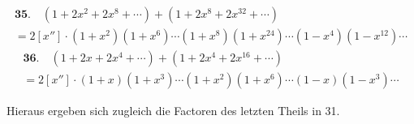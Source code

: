 \documentclass[10pt,a4paper]{article}
\begin{document}
%
\begin{multline*}
\textbf{35.} \quad (1 + 2x^2 + 2x^8 + \cdots) + (1 + 2x^8 + 2x^{32} + \cdots) \\
= 2[x''] \cdot (1 + x^2)(1 + x^6) \cdots (1 + x^8)(1 + x^{24}) \cdots (1 - x^4)(1 - x^{12}) \cdots
\end{multline*}
%
\begin{multline*}
\textbf{36.} \quad (1 + 2x + 2x^4 + \cdots) + (1 + 2x^4 + 2x^{16} + \cdots) \\
= 2[x''] \cdot (1 + x)(1 + x^3) \cdots (1 + x^2)(1 + x^6) \cdots (1 - x)(1 - x^3) \cdots
\end{multline*}

\newpage

Hieraus ergeben sich zugleich die Factoren des letzten Theils in 31.
\end{document}
